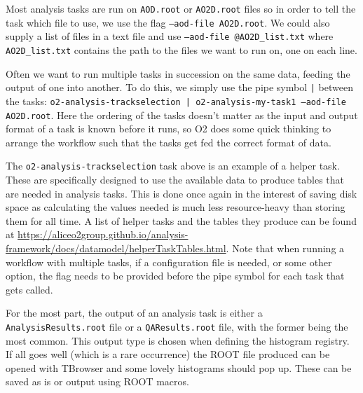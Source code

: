 Most analysis tasks are run on \texttt{AOD.root} or \texttt{AO2D.root} files so in order to tell the task which file to use, we use the flag \texttt{--aod-file AO2D.root}. We could also supply a list of files in a text file and use \texttt{--aod-file @AO2D\_list.txt} where \texttt{AO2D\_list.txt} contains the path to the files we want to run on, one on each line. 

Often we want to run multiple tasks in succession on the same data, feeding the output of one into another. To do this, we simply use the pipe symbol \texttt{|} between the tasks: \texttt{o2-analysis-trackselection | o2-analysis-my-task1 --aod-file AO2D.root}. Here the ordering of the tasks doesn't matter as the input and output format of a task is known before it runs, so O2 does some quick thinking to arrange the workflow such that the tasks get fed the correct format of data.

The \texttt{o2-analysis-trackselection} task above is an example of a helper task. These are specifically designed to use the available data to produce tables that are needed in analysis tasks. This is done once again in the interest of saving disk space as calculating the values needed is much less resource-heavy than storing them for all time. A list of helper tasks and the tables they produce can be found at \url{https://aliceo2group.github.io/analysis-framework/docs/datamodel/helperTaskTables.html}. Note that when running a workflow with multiple tasks, if a configuration file is needed, or some other option, the flag needs to be provided before the pipe symbol for each task that gets called.

For the most part, the output of an analysis task is either a \texttt{AnalysisResults.root} file or a \texttt{QAResults.root} file, with the former being the most common. This output type is chosen when defining the histogram registry. If all goes well (which is a rare occurrence) the ROOT file produced can be opened with TBrowser and some lovely histograms should pop up. These can be saved as is or output using ROOT macros. 